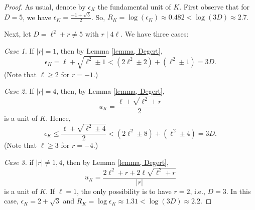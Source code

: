 \documentclass[10pt,a4paper]{amsart}
\begin{document}
 \begin{proof} 	
 As usual, denote by $\epsilon_K$ the fundamental unit of $K$. First observe that for $D=5$, we have $\epsilon_K=\frac{-1+\sqrt{5}}{2}$. So, $	R_K=\log\left( \epsilon_K \right) \approx 0.482 < \log(3 D) \approx 2.7$.


Next, let $D=\ell^2+r \neq 5$ with $r \mid 4\ell$.  
We have three cases:

	
\noindent 	
\textit{Case 1.} If $|r|=1$, then by Lemma \ref{lemma, Degert}, 
 		\begin{equation*}
 			\epsilon_K =\ell + \sqrt{\ell^2 \pm 1} < \left(2\ell^2 \pm 2\right)+\left(\ell^2 \pm 1\right)=3D.
 		\end{equation*}
 (Note that $\ell \geq 2$ for $r=-1$.)
 	 
\noindent
\textit{Case 2.} If $|r|=4$, then, by Lemma \ref{lemma, Degert},
	\begin{equation*}
		u_K=\frac{	\ell + \sqrt{\ell^2+r}}{2}
	\end{equation*}
	is a unit of $K$. 
		Hence, 
	\begin{equation*}
		\epsilon_K \leq 	\frac{	\ell + \sqrt{\ell^2 \pm 4}}{2} 	< \left(2 \ell^2\pm 8\right) + \left(\ell^2\pm 4\right)=3D.
	\end{equation*}
	(Note that $\ell \geq 3$ for $r=-4$.)

\noindent 
\textit{Case 3.} if $|r| \neq 1,4$, then by Lemma \ref{lemma, Degert}, 
	\begin{equation*}
		u_K=\frac{	2\ell^2+r + 2 \ell \sqrt{\ell^2+r}}{|r|}
	\end{equation*}
 	is a unit of $K$. If $\ell=1$, the only possibility is to have $r=2$, i.e., $D=3$. In this case, $\epsilon_K=2+\sqrt{3}$ and $	R_K=\log{\epsilon_{K}} \approx 1.31 < \log (3D) \approx 2.2$.


\end{proof}
\end{document}
